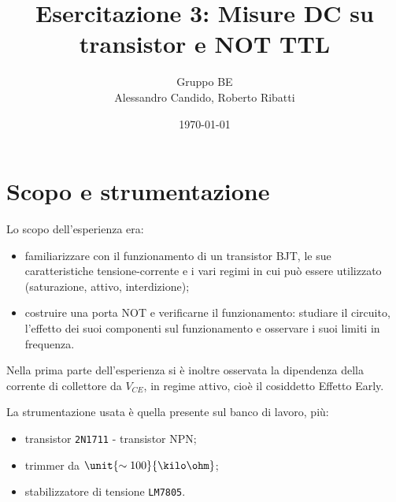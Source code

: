 \documentclass[10pt,a4paper]{article}
\title{Esercitazione 3: Misure DC su transistor e NOT TTL}
\author{Gruppo BE \\ Alessandro Candido, Roberto Ribatti}
\date{\today}
\def\code#1{\texttt{#1}}
\begin{document}
\maketitle

\section{Scopo e strumentazione}
Lo scopo dell'esperienza era:
\begin{itemize}
\item familiarizzare con il funzionamento di un transistor BJT, le sue caratteristiche tensione-corrente e i vari regimi in cui può essere utilizzato (saturazione, attivo, interdizione);
\item costruire una porta NOT e  verificarne il funzionamento: studiare il circuito, l'effetto dei suoi componenti sul funzionamento e osservare i suoi limiti in frequenza.
\end{itemize}

Nella prima parte dell'esperienza si è inoltre osservata la dipendenza della corrente di collettore da $V_{CE}$, in regime attivo, cioè il cosiddetto Effetto Early.

La strumentazione usata è quella presente sul banco di lavoro, più:
\begin{itemize}
\item transistor \code{2N1711} - transistor NPN;
\item trimmer da $\unit{\sim 100}{\kilo\ohm}$;
\item stabilizzatore di tensione \code{LM7805}.
\end{itemize}
\end{document}
